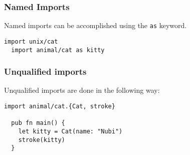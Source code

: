 \vs
\subsubsection*{\rmfamily Named Imports}
Named imports can be accomplished using the 
\lstinline[language=Gleam, basicstyle=\small]!as! keyword.

\begin{lstlisting}[belowskip=-\baselineskip]
  import unix/cat
  import animal/cat as kitty  
\end{lstlisting}

\vs
\subsubsection*{\rmfamily Unqualified imports}

Unqualified imports are done in the following way:

\begin{lstlisting}[belowskip=-\baselineskip]
  import animal/cat.{Cat, stroke}

  pub fn main() {
    let kitty = Cat(name: "Nubi")
    stroke(kitty)
  }
\end{lstlisting}
